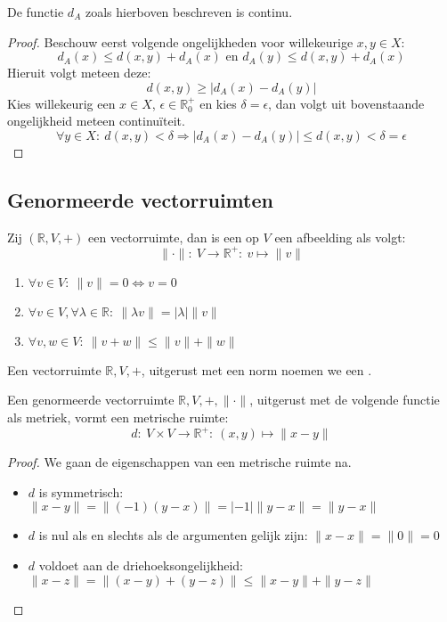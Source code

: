 \documentclass[main.tex]{subfiles}
\begin{document}
\begin{st}
  De functie $d_{A}$ zoals hierboven beschreven is continu.
  
  \begin{proof}
    Beschouw eerst volgende ongelijkheden voor willekeurige $x,y\in X$:
    \[ d_{A}(x) \le d(x,y) + d_{A}(x) \text{ en } d_{A}(y) \le d(x,y) + d_{A}(x) \]
    Hieruit volgt meteen deze:
    \[ d(x,y) \ge |d_{A}(x)-d_{A}(y)| \]
    Kies willekeurig een $x\in X$, $\epsilon \in \mathbb{R}_{0}^{+}$ en kies $\delta = \epsilon$, dan volgt uit bovenstaande ongelijkheid meteen continu\"iteit.
    \[ \forall y\in X:\ d(x,y) < \delta \Rightarrow |d_{A}(x)-d_{A}(y)| \le d(x,y) < \delta = \epsilon \]
    \feed
  \end{proof}
\end{st}


\subsection{Genormeerde vectorruimten}
\label{sec:genorm-vect}

\begin{de}
  \label{de:norm}
  Zij $(\mathbb{R},V,+)$ een vectorruimte, dan is een  op $V$ een afbeelding als volgt:
  \[ \|\cdot\|:\ V \rightarrow \mathbb{R}^{+}:\ v \mapsto \|v\| \]
  \begin{enumerate}
  \item $\forall v\in V:\ \|v\| = 0 \Leftrightarrow v=0$
  \item $\forall v\in V, \forall \lambda \in \mathbb{R}:\ \|\lambda v\| = |\lambda|\|v\|$
  \item $\forall v,w\in V:\ \|v+w\| \le \|v\| + \|w\|$
  \end{enumerate}
\end{de}

\begin{de}
  Een vectorruimte $\mathbb{R},V,+$, uitgerust met een norm noemen we een .
\end{de}

\begin{st}
  Een genormeerde vectorruimte $\mathbb{R},V,+,\|\cdot\|$, uitgerust met de volgende functie als metriek, vormt een metrische ruimte:
  \[ d:\ V \times V \rightarrow \mathbb{R}^{+}:\ (x,y) \mapsto \|x-y\| \]

  \begin{proof}
    We gaan de eigenschappen van een metrische ruimte na.
    \begin{itemize}
    \item $d$ is symmetrisch: $\|x-y\| = \|(-1)(y-x)\| = |-1|\|y-x\| = \|y-x\|$
    \item $d$ is nul als en slechts als de argumenten gelijk zijn: $\|x-x\| = \|0\| = 0$
    \item $d$ voldoet aan de driehoeksongelijkheid: $\| x-z \| = \| (x-y)+(y-z) \| \le \|x-y\| + \| y-z \|$
    \end{itemize}
  \end{proof}
\end{st}
\end{document}
